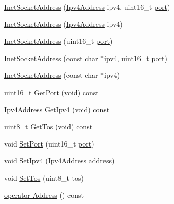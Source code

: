 \begin{DoxyCompactItemize}
\item 
\hyperlink{classns3_1_1InetSocketAddress_aa55f5076926d5e11c266b2424194f54a}{Inet\+Socket\+Address} (\hyperlink{classns3_1_1Ipv4Address}{Ipv4\+Address} ipv4, uint16\+\_\+t \hyperlink{visualizer-ideas_8txt_a21ff1c530daf8435e00048b7fc2c58e3}{port})
\item 
\hyperlink{classns3_1_1InetSocketAddress_a17a75aa46ee1a4f4379cdaf103398bfd}{Inet\+Socket\+Address} (\hyperlink{classns3_1_1Ipv4Address}{Ipv4\+Address} ipv4)
\item 
\hyperlink{classns3_1_1InetSocketAddress_ae24479999c7dca94121f82af679c3999}{Inet\+Socket\+Address} (uint16\+\_\+t \hyperlink{visualizer-ideas_8txt_a21ff1c530daf8435e00048b7fc2c58e3}{port})
\item 
\hyperlink{classns3_1_1InetSocketAddress_a3a19d83e984c5cca52f438defa6fbb12}{Inet\+Socket\+Address} (const char $\ast$ipv4, uint16\+\_\+t \hyperlink{visualizer-ideas_8txt_a21ff1c530daf8435e00048b7fc2c58e3}{port})
\item 
\hyperlink{classns3_1_1InetSocketAddress_a3341c49774fc2d5429fa27c88381e57a}{Inet\+Socket\+Address} (const char $\ast$ipv4)
\item 
uint16\+\_\+t \hyperlink{classns3_1_1InetSocketAddress_ac1d62cfd1075b36df273b382c5bd3e14}{Get\+Port} (void) const 
\item 
\hyperlink{classns3_1_1Ipv4Address}{Ipv4\+Address} \hyperlink{classns3_1_1InetSocketAddress_a925d5288448467062884ce0363a63658}{Get\+Ipv4} (void) const 
\item 
uint8\+\_\+t \hyperlink{classns3_1_1InetSocketAddress_a899c6bbece13dc090cae75e2ca32d98a}{Get\+Tos} (void) const 
\item 
void \hyperlink{classns3_1_1InetSocketAddress_a160443756de11e640d1c1870131463dc}{Set\+Port} (uint16\+\_\+t \hyperlink{visualizer-ideas_8txt_a21ff1c530daf8435e00048b7fc2c58e3}{port})
\item 
void \hyperlink{classns3_1_1InetSocketAddress_a683f9bd4eeaa925ef71234cbf003f4f2}{Set\+Ipv4} (\hyperlink{classns3_1_1Ipv4Address}{Ipv4\+Address} address)
\item 
void \hyperlink{classns3_1_1InetSocketAddress_a574001030dfb21d2963b2b4da081889d}{Set\+Tos} (uint8\+\_\+t tos)
\item 
\hyperlink{classns3_1_1InetSocketAddress_a66e7dda4f79f7c79ba6567fb8bfe73f9}{operator Address} () const 
\end{DoxyCompactItemize}

